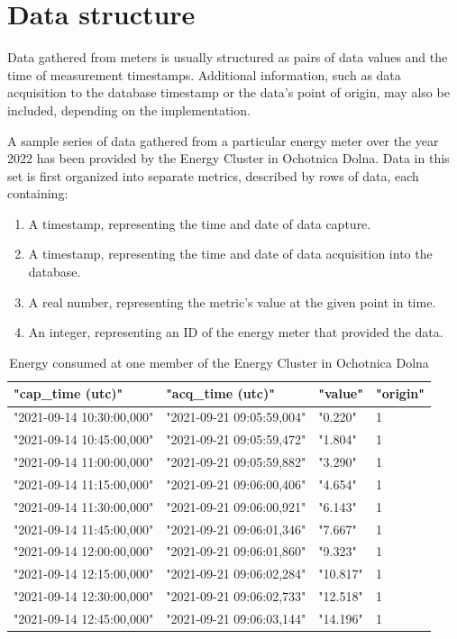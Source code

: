 \section{Data structure}

\par Data gathered from meters is usually structured as pairs of data values and the time of measurement timestamps. Additional information, such as data acquisition to the database timestamp or the data's point of origin, may also be included, depending on the implementation. 
\par A sample series of data gathered from a particular energy meter over the year 2022 has been provided by the Energy Cluster in Ochotnica Dolna. Data in this set is first organized into separate metrics, described by rows of data, each containing\citep{ochotnica}:
\begin{enumerate}
  \item A timestamp, representing the time and date of data capture.
  \item A timestamp, representing the time and date of data acquisition into the database.
  \item A real number, representing the metric's value at the given point in time.
  \item An integer, representing an ID of the energy meter that provided the data.
\end{enumerate}

\begin{table}[!ht]
    \centering
    \caption{Energy consumed at one member of the Energy Cluster in Ochotnica Dolna \citep{ochotnica}}
    \begin{tabular}{llll}
    \hline
        "cap\_time (utc)" & "acq\_time (utc)" & "value" & "origin" \\ \hline
        "2021-09-14 10:30:00,000" & "2021-09-21 09:05:59,004" & "0.220" & 1 \\ 
        "2021-09-14 10:45:00,000" & "2021-09-21 09:05:59,472" & "1.804" & 1 \\ 
        "2021-09-14 11:00:00,000" & "2021-09-21 09:05:59,882" & "3.290" & 1 \\ 
        "2021-09-14 11:15:00,000" & "2021-09-21 09:06:00,406" & "4.654" & 1 \\ 
        "2021-09-14 11:30:00,000" & "2021-09-21 09:06:00,921" & "6.143" & 1 \\ 
        "2021-09-14 11:45:00,000" & "2021-09-21 09:06:01,346" & "7.667" & 1 \\ 
        "2021-09-14 12:00:00,000" & "2021-09-21 09:06:01,860" & "9.323" & 1 \\ 
        "2021-09-14 12:15:00,000" & "2021-09-21 09:06:02,284" & "10.817" & 1 \\ 
        "2021-09-14 12:30:00,000" & "2021-09-21 09:06:02,733" & "12.518" & 1 \\ 
        "2021-09-14 12:45:00,000" & "2021-09-21 09:06:03,144" & "14.196" & 1 \\ \hline
    \end{tabular}
\end{table}

